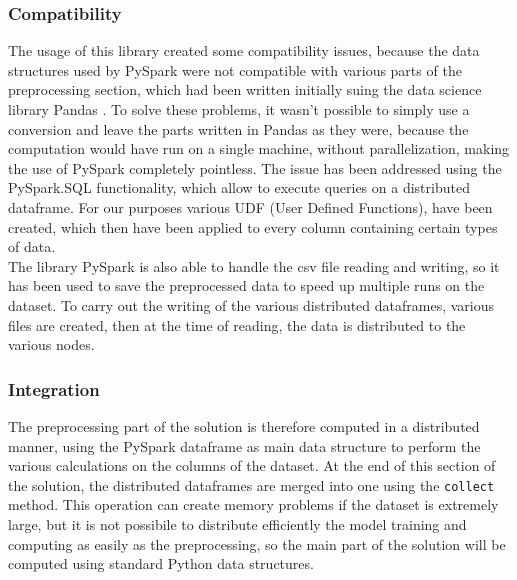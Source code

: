 \documentclass[
	letterpaper, %
	10pt, %
]{class}
\begin{document}
\subsubsection{Compatibility}

The usage of this library created some compatibility issues, because the data structures used by PySpark were not compatible with various parts of the preprocessing section, which had been written initially suing the data science library Pandas \cite{pandas}.
To solve these problems, it wasn't possible to simply use a conversion and leave the parts written in Pandas as they were, because the computation would have run on a single machine, without parallelization, making the use of PySpark completely pointless.
The issue has been addressed using the PySpark.SQL functionality, which allow to execute queries on a distributed dataframe. For our purposes various UDF (User Defined Functions), have been created, which then have been applied to every column containing certain types of data.\\

The library PySpark is also able to handle the csv file reading and writing, so it has been used to save the preprocessed data to speed up multiple runs on the dataset. To carry out the writing of the various distributed dataframes, various files are created, then at the time of reading, the data is distributed to the various nodes.\\

\subsubsection{Integration}

The preprocessing part of the solution is therefore computed in a distributed manner, using the PySpark dataframe as main data structure to perform the various calculations on the columns of the dataset.
At the end of this section of the solution, the distributed dataframes are merged into one using the \texttt{collect} method. This operation can create memory problems if the dataset is extremely large, but it is not possibile to distribute efficiently the model training
and computing as easily as the preprocessing, so the main part of the solution will be computed using standard Python data structures.

\end{document}
